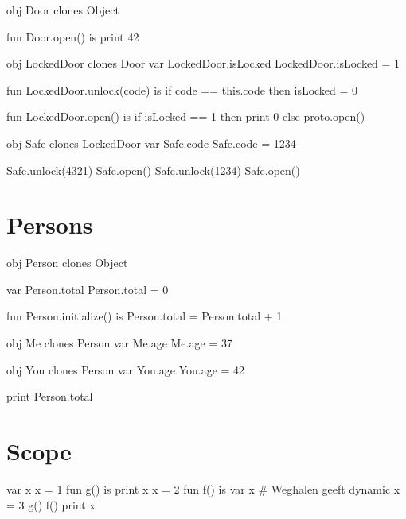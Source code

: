 \begin{minipage}{0.5\textwidth}
\begin{program}
obj Door clones Object

fun Door.open() is
    print 42

obj LockedDoor clones Door
var LockedDoor.isLocked
LockedDoor.isLocked = 1

fun LockedDoor.unlock(code) is
    if code == this.code then
        isLocked = 0

fun LockedDoor.open() is
    if isLocked == 1 then
        print 0
    else
        proto.open()

obj Safe clones LockedDoor
var Safe.code
Safe.code = 1234

Safe.unlock(4321)
Safe.open()
Safe.unlock(1234)
Safe.open()
\end{program}
\end{minipage}
\begin{minipage}{0.5\textwidth}

\end{minipage}

\newpage
\section{Persons}

\begin{minipage}{0.5\textwidth}
\begin{program}
obj Person clones Object

var Person.total
Person.total = 0

fun Person.initialize() is
    Person.total = Person.total + 1

obj Me clones Person
var Me.age
Me.age = 37

obj You clones Person
var You.age
You.age = 42

print Person.total
\end{program}
\end{minipage}
\begin{minipage}{0.5\textwidth}

\end{minipage}

\section{Scope}

\begin{minipage}{0.5\textwidth}
\begin{program}
var x
x = 1
fun g() is
    print x
    x = 2
fun f() is
    var x # Weghalen geeft dynamic
    x = 3
    g()
f()
print x
\end{program}
\end{minipage}
\begin{minipage}{0.5\textwidth}

\end{minipage}

